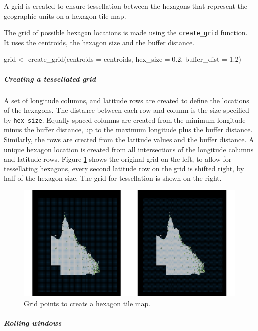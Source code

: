 A grid is created to ensure tessellation between the hexagons that
represent the geographic units on a hexagon tile map.

The grid of possible hexagon locations is made using the
\texttt{create\_grid} function. It uses the centroids, the hexagon size
and the buffer distance.

\begin{Schunk}
\begin{Sinput}
grid <- create_grid(centroids = centroids, hex_size = 0.2, buffer_dist = 1.2)
\end{Sinput}
\end{Schunk}

\hypertarget{creating-a-tessellated-grid}{%
\subparagraph{Creating a tessellated
grid}\label{creating-a-tessellated-grid}}

A set of longitude columns, and latitude rows are created to define the
locations of the hexagons. The distance between each row and column is
the size specified by \texttt{hex\_size}. Equally spaced columns are
created from the minimum longitude minus the buffer distance, up to the
maximum longitude plus the buffer distance. Similarly, the rows are
created from the latitude values and the buffer distance. A unique
hexagon location is created from all intersections of the longitude
columns and latitude rows. Figure \ref{fig:grid2} shows the original
grid on the left, to allow for tessellating hexagons, every second
latitude row on the grid is shifted right, by half of the hexagon size.
The grid for tessellation is shown on the right.

\begin{figure}[h]
\centering
\includegraphics[width=16cm]{figs/2grid.png}
\caption{\label{fig:grid2}Grid points to create a hexagon tile map.}
\end{figure}

\hypertarget{rolling-windows}{%
\subparagraph{Rolling windows}\label{rolling-windows}}

